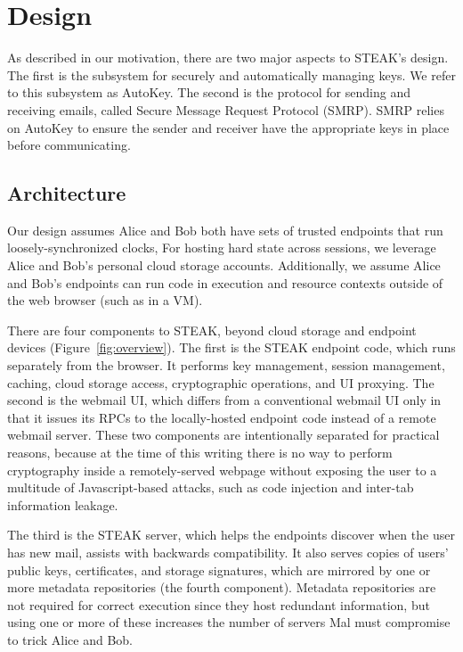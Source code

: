 \section{Design}
\label{sec:design}

As described in our motivation, there are two major aspects to STEAK's design.  The first is the subsystem for securely and automatically managing keys.  We refer to this subsystem as AutoKey.  The second is the protocol for sending and receiving emails, called Secure Message Request Protocol (SMRP).  SMRP relies on AutoKey to ensure the sender and receiver have the appropriate keys in place before communicating.

\subsection{Architecture}
Our design assumes Alice and Bob both have sets of trusted endpoints that run loosely-synchronized clocks, For hosting hard state across sessions, we leverage Alice and Bob's personal cloud storage accounts.  Additionally, we assume Alice and Bob's endpoints can run code in execution and resource contexts outside of the web browser (such as in a VM).

There are four components to STEAK, beyond cloud storage and endpoint devices (Figure~\ref{fig:overview}). The first is the STEAK endpoint code, which runs separately from the browser.  It performs key management, session management, caching, cloud storage access, cryptographic operations, and UI proxying. The second is the webmail UI, which differs from a conventional webmail UI only in that it issues its RPCs to the locally-hosted endpoint code instead of a remote webmail server.  These two components are intentionally separated for practical reasons, because at the time of this writing there is no way to perform cryptography inside a remotely-served webpage without exposing the user to a multitude of Javascript-based attacks, such as code injection and inter-tab information leakage.

The third is the STEAK server, which helps the endpoints discover when the user has new mail, assists with backwards compatibility.  It also serves copies of users' public keys, certificates, and storage signatures, which are mirrored by one or more metadata repositories (the fourth component).  Metadata repositories are not required for correct execution since they host redundant information, but using one or more of these increases the number of servers Mal must compromise to trick Alice and Bob.

